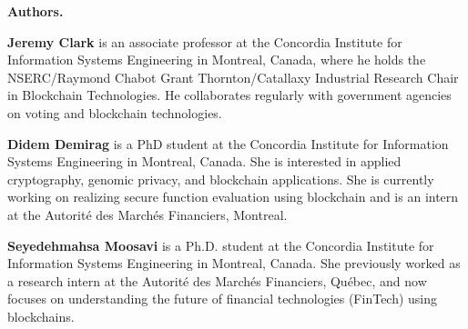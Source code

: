 \documentclass[acmlarge,screen]{acmart}
\begin{document}
\begin{Sidebar*}[h!]
\begin{framed}
\begin{flushleft}
\textbf{Authors.} \newline

\textbf{Jeremy Clark} is an associate professor at the Concordia Institute for Information Systems Engineering in Montreal, Canada, where he holds the NSERC/Raymond Chabot Grant Thornton/Catallaxy Industrial Research Chair in Blockchain Technologies. He collaborates regularly with government agencies on voting and blockchain technologies. \newline

\textbf{Didem Demirag} is a PhD student at the Concordia Institute for Information Systems Engineering in Montreal, Canada. She is interested in applied cryptography, genomic privacy, and blockchain applications. She is currently working on realizing secure function evaluation using blockchain and is an intern at the Autorit\'e des March\'es Financiers, Montreal.
 \newline

\textbf{Seyedehmahsa Moosavi} is a Ph.D. student at the Concordia Institute for Information Systems Engineering in Montreal, Canada. She previously worked as a research intern at the Autorité des Marchés Financiers, Québec, and now focuses on understanding the future of financial technologies (FinTech) using blockchains. \newline

\end{flushleft}
\end{framed}
\end{Sidebar*}



\end{document}
